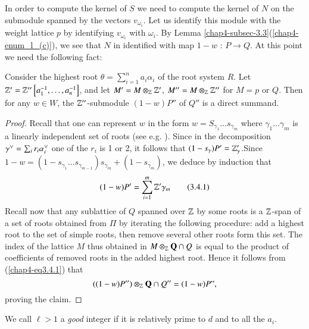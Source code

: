 \subsection{}\label{chap4-subsec-3.4}
In order to compute the kernel of $S$ we need to compute the kernel of $N$ on the submodule spanned by the vectors $v_{\omega_{i}}$. Let us identify this module with the weight lattice $p$ by identifying $v_{\omega_{i}}$ with $\omega_{i}$. By Lemma \ref{chap4-subsec-3.3}(\ref{chap4-enum_l_(c)}), we see that $N$ in identified with map $1-w$ : $P\rightarrow Q$. At this point we need the following fact:

\begin{lemma*}
Consider the highest root $\theta =\sum_{i=1}^{n}a_{i}\alpha_{i}$ of the root system $R$. Let $\mathbb{Z}' = \mathbb{Z}''\left[a_{1}^{-1}, \ldots, a_{n}^{-1}\right]$, and let $M' = M \otimes_{\mathbb{Z}}\mathbb{Z}'$, $M'' = M\otimes_{\mathbb{Z}}\mathbb{Z}''$ for $M=p$ or $Q$. Then for any $w \in W$, the $\mathbb{Z}''$-submodule $(1-w)P''$ of $Q''$ is a direct summand.
\end{lemma*}

\begin{proof}
Recall that one can represent $w$ in the form $w=S_{\gamma_{1}}\ldots s_{\gamma_{m}}$ where $\gamma_{1} \ldots \gamma_{m}$ is a linearly independent set of roots (see e.g. \cite{chap4-keyC}). Since in the decomposition
$\gamma\spcheck =\sum_{i}r_{i}\alpha_{i}\spcheck$ one of the $r_{i}$ is 1 or 2, it follows that $(1-s_{\gamma})P' = \mathbb{Z}'_{\gamma}$.\pageoriginale Since $1-w = (1-s_{\gamma_{1}}\ldots s_{\gamma_{m-1}})s_{\gamma_{m}} + (1-s_{\gamma_{m}})$, we deduce by induction that
\begin{equation*}
(1-w)P' = \sum\limits_{i=1}^{m}\mathbb{Z}'\gamma_{m}\tag{3.4.1}\label{chap4-eq3.4.1}
\end{equation*}
Recall now that any sublattice of $Q$ spanned over $\mathbb{Z}$ by some roots is a $\mathbb{Z}$-span of a set of roots obtained from $\Pi$ by iterating the following procedure: add a highest root to the set of simple roots, then remove several other roots form this set. The index of the lattice $M$ thus obtained in $M\otimes_{\mathbb{Z}}\mathbf{Q} \cap Q$ is equal to the product of coefficients of removed roots in the added highest root. Hence it follows from (\ref{chap4-eq3.4.1}) that
$$
((1-w)P'')\otimes_{\mathbb{Z}} \mathbf{Q} \cap Q'' = (1-w)P",
$$
proving the claim.
\end{proof}

We call $\ell > 1$ a \textit{good} integer if it is relatively prime to $d$ and to all the $a_{i}$.

